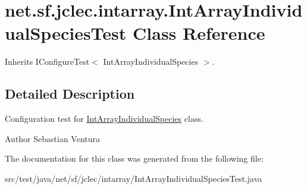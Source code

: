 \hypertarget{classnet_1_1sf_1_1jclec_1_1intarray_1_1_int_array_individual_species_test}{\section{net.\-sf.\-jclec.\-intarray.\-Int\-Array\-Individual\-Species\-Test Class Reference}
\label{classnet_1_1sf_1_1jclec_1_1intarray_1_1_int_array_individual_species_test}
}


Inherits I\-Configure\-Test$<$ Int\-Array\-Individual\-Species $>$.



\subsection{Detailed Description}
Configuration test for \hyperlink{classnet_1_1sf_1_1jclec_1_1intarray_1_1_int_array_individual_species}{Int\-Array\-Individual\-Species} class.

\begin{DoxyAuthor}{Author}
Sebastian Ventura 
\end{DoxyAuthor}


The documentation for this class was generated from the following file\-:\begin{DoxyCompactItemize}
\item 
src/test/java/net/sf/jclec/intarray/Int\-Array\-Individual\-Species\-Test.\-java\end{DoxyCompactItemize}
